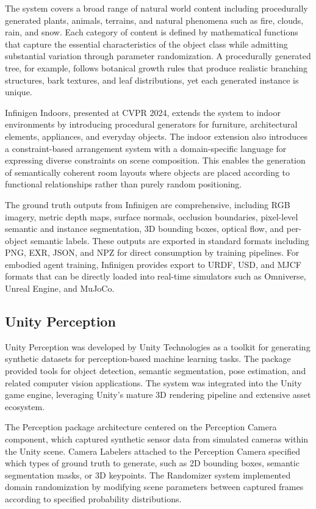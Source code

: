 The system covers a broad range of natural world content including procedurally generated plants, animals, terrains, and natural phenomena such as fire, clouds, rain, and snow. Each category of content is defined by mathematical functions that capture the essential characteristics of the object class while admitting substantial variation through parameter randomization. A procedurally generated tree, for example, follows botanical growth rules that produce realistic branching structures, bark textures, and leaf distributions, yet each generated instance is unique.

Infinigen Indoors, presented at CVPR 2024, extends the system to indoor environments by introducing procedural generators for furniture, architectural elements, appliances, and everyday objects. The indoor extension also introduces a constraint-based arrangement system with a domain-specific language for expressing diverse constraints on scene composition. This enables the generation of semantically coherent room layouts where objects are placed according to functional relationships rather than purely random positioning.

The ground truth outputs from Infinigen are comprehensive, including RGB imagery, metric depth maps, surface normals, occlusion boundaries, pixel-level semantic and instance segmentation, 3D bounding boxes, optical flow, and per-object semantic labels. These outputs are exported in standard formats including PNG, EXR, JSON, and NPZ for direct consumption by training pipelines. For embodied agent training, Infinigen provides export to URDF, USD, and MJCF formats that can be directly loaded into real-time simulators such as Omniverse, Unreal Engine, and MuJoCo.

\subsection{Unity Perception}

Unity Perception was developed by Unity Technologies as a toolkit for generating synthetic datasets for perception-based machine learning tasks. The package provided tools for object detection, semantic segmentation, pose estimation, and related computer vision applications. The system was integrated into the Unity game engine, leveraging Unity's mature 3D rendering pipeline and extensive asset ecosystem.

The Perception package architecture centered on the Perception Camera component, which captured synthetic sensor data from simulated cameras within the Unity scene. Camera Labelers attached to the Perception Camera specified which types of ground truth to generate, such as 2D bounding boxes, semantic segmentation masks, or 3D keypoints. The Randomizer system implemented domain randomization by modifying scene parameters between captured frames according to specified probability distributions.

